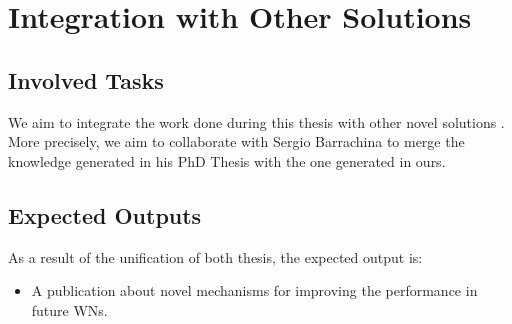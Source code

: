 \documentclass[12pt, a4paper,twoside]{tesi_upf}
\begin{document}
		\section{Integration with Other Solutions}
		\label{section:contribution5}
			\subsection{Involved Tasks}	
				We aim to integrate the work done during this thesis with other novel solutions . More precisely, we aim to collaborate with Sergio Barrachina to merge the knowledge generated in his PhD Thesis with the one generated in ours.	
			\subsection{Expected Outputs}
				As a result of the unification of both thesis, the expected output is:
				\begin{itemize}
					\item A publication about novel mechanisms for improving the performance in future WNs.
				\end{itemize}
						
	
	
\end{document}
